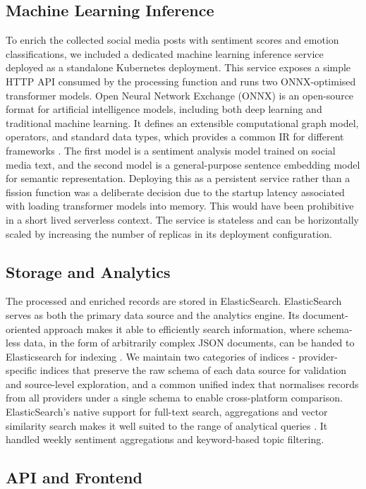 \subsection{Machine Learning Inference}
To enrich the collected social media posts with sentiment scores and emotion classifications, we included a dedicated machine learning inference service deployed as a standalone Kubernetes deployment. This service exposes a simple HTTP API consumed by the processing function and runs two ONNX-optimised transformer models. Open Neural Network Exchange (ONNX) is an open-source format for artificial intelligence models, including both deep learning and traditional machine learning. It defines an extensible computational graph model, operators, and standard data types, which provides a common IR for different frameworks \cite{jin2020compiling}. The first model is a sentiment analysis model trained on social media text, and the second model is a general-purpose sentence embedding model for semantic representation. Deploying this as a persistent service rather than a fission function was a deliberate decision due to the startup latency associated with loading transformer models into memory. This would have been prohibitive in a short lived serverless context. The service is stateless and can be horizontally scaled by increasing the number of replicas in its deployment configuration.


\subsection{Storage and Analytics}
The processed and enriched records are stored in ElasticSearch. ElasticSearch serves as both the primary data source and the analytics engine. Its document-oriented approach makes it able to efficiently search information, where schema-less data, in the form of arbitrarily complex JSON documents, can be handed to Elasticsearch for indexing \cite{elasticsearch2018software}. We maintain two categories of indices - provider-specific indices that preserve the raw schema of each data source for validation and source-level exploration, and a common unified index that normalises records from all providers under a single schema to enable cross-platform comparison. ElasticSearch’s native support for full-text search, aggregations and vector similarity search makes it well suited to the range of analytical queries . It handled weekly sentiment aggregations and keyword-based topic filtering.


\subsection{API and Frontend}

